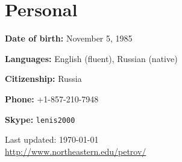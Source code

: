 \documentclass[letterpaper,11pt]{article}
\def\footerlink{http://www.northeastern.edu/petrov/}
\begin{document}
\section*{Personal}

\textbf{Date of birth:} November 5, 1985

\textbf{Languages:} English (fluent), Russian (native)

\textbf{Citizenship:} Russia

\textbf{Phone:} +1-857-210-7948

\textbf{Skype:} \texttt{lenis2000}



\bigskip

\begin{center}
  \begin{footnotesize}
    Last updated: \today \\
    \href{\footerlink}{\url{\footerlink}}
  \end{footnotesize}
\end{center}
\end{document}

